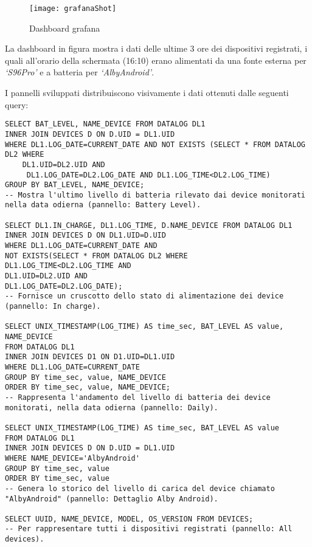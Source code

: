\documentclass[target=bach]{thud}
\begin{document}
                    \graphicspath{ {./img/} }
                    \begin{figure}[h]
                        \centering
                        \texttt{[image: grafanaShot]}
                        \caption{Dashboard grafana}
                        \label{fig:Infografica di Grafana }
                    \end{figure}
                    \newpage
                    La dashboard in figura mostra i dati delle ultime 3 ore dei dispositivi registrati, i quali all'orario della schermata (16:10) erano alimentati da una fonte esterna per \textit{`S96Pro'} e a batteria per \textit{`AlbyAndroid'}.


                    I pannelli sviluppati distribuiscono visivamente i dati ottenuti dalle seguenti query:
\begin{lstlisting}
SELECT BAT_LEVEL, NAME_DEVICE FROM DATALOG DL1
INNER JOIN DEVICES D ON D.UID = DL1.UID
WHERE DL1.LOG_DATE=CURRENT_DATE AND NOT EXISTS (SELECT * FROM DATALOG DL2 WHERE
    DL1.UID=DL2.UID AND
     DL1.LOG_DATE=DL2.LOG_DATE AND DL1.LOG_TIME<DL2.LOG_TIME)
GROUP BY BAT_LEVEL, NAME_DEVICE;
-- Mostra l'ultimo livello di batteria rilevato dai device monitorati nella data odierna (pannello: Battery Level).

SELECT DL1.IN_CHARGE, DL1.LOG_TIME, D.NAME_DEVICE FROM DATALOG DL1
INNER JOIN DEVICES D ON DL1.UID=D.UID
WHERE DL1.LOG_DATE=CURRENT_DATE AND
NOT EXISTS(SELECT * FROM DATALOG DL2 WHERE
DL1.LOG_TIME<DL2.LOG_TIME AND
DL1.UID=DL2.UID AND
DL1.LOG_DATE=DL2.LOG_DATE);
-- Fornisce un cruscotto dello stato di alimentazione dei device (pannello: In charge).

SELECT UNIX_TIMESTAMP(LOG_TIME) AS time_sec, BAT_LEVEL AS value, NAME_DEVICE
FROM DATALOG DL1
INNER JOIN DEVICES D1 ON D1.UID=DL1.UID
WHERE DL1.LOG_DATE=CURRENT_DATE
GROUP BY time_sec, value, NAME_DEVICE
ORDER BY time_sec, value, NAME_DEVICE;
-- Rappresenta l'andamento del livello di batteria dei device monitorati, nella data odierna (pannello: Daily).

SELECT UNIX_TIMESTAMP(LOG_TIME) AS time_sec, BAT_LEVEL AS value
FROM DATALOG DL1
INNER JOIN DEVICES D ON D.UID = DL1.UID
WHERE NAME_DEVICE='AlbyAndroid'
GROUP BY time_sec, value
ORDER BY time_sec, value
-- Genera lo storico del livello di carica del device chiamato "AlbyAndroid" (pannello: Dettaglio Alby Android).

SELECT UUID, NAME_DEVICE, MODEL, OS_VERSION FROM DEVICES;
-- Per rappresentare tutti i dispositivi registrati (pannello: All devices).

\end{lstlisting}
\end{document}

